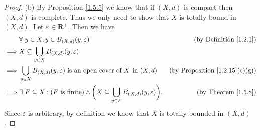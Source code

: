 \begin{proof}{(b)}
    By Proposition \ref{1.5.5} we know that if \((X, d)\) is compact then \((X, d)\) is complete.
    Thus we only need to show that \(X\) is totally bound in \((X, d)\).
    Let \(\varepsilon \in \mathbf{R}^+\).
    Then we have
    \begin{align*}
                 & \forall\ y \in X, y \in B_{(X, d)}(y, \varepsilon)                                                                         & \text{(by Definition \ref{1.2.1})}         \\
        \implies & X \subseteq \bigcup_{y \in X} B_{(X, d)}(y, \varepsilon)                                                                                                                \\
        \implies & \bigcup_{y \in X} B_{(X, d)}(y, \varepsilon) \text{ is an open cover of } X \text{ in } (X, d)                             & \text{(by Proposition \ref{1.2.15}(c)(g))} \\
        \implies & \exists\ F \subseteq X : (F \text{ is finite}) \land \bigg(X \subseteq \bigcup_{y \in F} B_{(X, d)}(y, \varepsilon)\bigg). & \text{(by Theorem \ref{1.5.8})}
    \end{align*}
    Since \(\varepsilon\) is arbitrary, by definition we know that \(X\) is totally bounded in \((X, d)\).
\end{proof}

